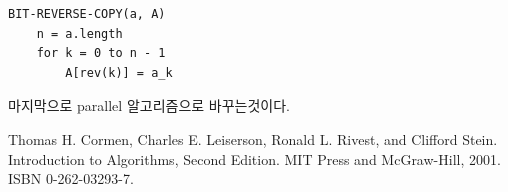 \documentclass{oblivoir}
\begin{document}
\begin{lstlisting}[style = CStyle]
BIT-REVERSE-COPY(a, A)
    n = a.length
    for k = 0 to n - 1
        A[rev(k)] = a_k
\end{lstlisting}


마지막으로 parallel 알고리즘으로 바꾸는것이다.


\begin{thebibliography}{}
    Thomas H. Cormen, Charles E. Leiserson, Ronald L. Rivest, and Clifford Stein. Introduction to Algorithms, Second Edition. MIT Press and McGraw-Hill, 2001. ISBN 0-262-03293-7.
\end{thebibliography}
\end{document}
